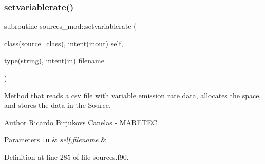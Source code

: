 \subsubsection{\texorpdfstring{setvariablerate()}{setvariablerate()}}
{\footnotesize\ttfamily subroutine sources\+\_\+mod\+::setvariablerate (\begin{DoxyParamCaption}\item[{class(\mbox{\hyperlink{structsources__mod_1_1source__class}{source\+\_\+class}}), intent(inout)}]{self,  }\item[{type(string), intent(in)}]{filename }\end{DoxyParamCaption})\hspace{0.3cm}{\ttfamily [private]}}



Method that reads a csv file with variable emission rate data, allocates the space, and stores the data in the Source. 

\begin{DoxyAuthor}{Author}
Ricardo Birjukovs Canelas -\/ M\+A\+R\+E\+T\+EC 
\end{DoxyAuthor}

\begin{DoxyParams}[1]{Parameters}
\mbox{\tt in}  & {\em self,filename} & \\
\hline
\end{DoxyParams}


Definition at line 285 of file sources.\+f90.


